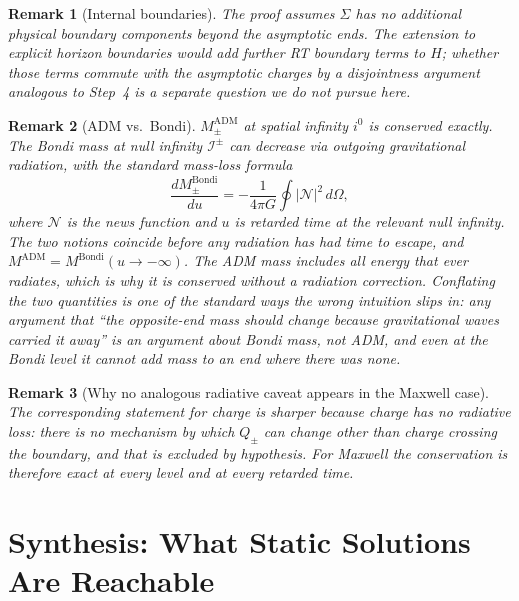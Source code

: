 \documentclass[aps,prd,onecolumn,nofootinbib,superscriptaddress]{revtex4-2}
\newtheorem{remark}{Remark}
\begin{document}
\begin{remark}[Internal boundaries]
The proof assumes $\Sigma$ has no additional physical boundary components beyond the asymptotic ends. The extension to explicit horizon boundaries would add further RT boundary terms to $H$; whether those terms commute with the asymptotic charges by a disjointness argument analogous to Step~4 is a separate question we do not pursue here.
\end{remark}

\begin{remark}[ADM vs.\ Bondi]
\label{rem:adm-vs-bondi}
$M_\pm^{\mathrm{ADM}}$ at spatial infinity $i^0$ is conserved exactly. The Bondi mass at null infinity $\mathcal{I}^\pm$ can decrease via outgoing gravitational radiation, with the standard mass-loss formula
\begin{equation}
\frac{dM_\pm^{\mathrm{Bondi}}}{du} = -\frac{1}{4\pi G}\oint |\mathcal{N}|^2\, d\Omega,
\end{equation}
where $\mathcal{N}$ is the news function and $u$ is retarded time at the relevant null infinity.\cite{BondiVanderBurgMetzner1962Gravitational,Sachs1962Asymptotic} The two notions coincide before any radiation has had time to escape, and $M^{\mathrm{ADM}} = M^{\mathrm{Bondi}}(u\to-\infty)$. The ADM mass includes all energy that ever radiates, which is why it is conserved without a radiation correction. Conflating the two quantities is one of the standard ways the wrong intuition slips in: any argument that ``the opposite-end mass should change because gravitational waves carried it away'' is an argument about Bondi mass, not ADM, and even at the Bondi level it cannot \emph{add} mass to an end where there was none.
\end{remark}

\begin{remark}[Why no analogous radiative caveat appears in the Maxwell case]
The corresponding statement for charge is sharper because charge has no radiative loss: there is no mechanism by which $Q_\pm$ can change other than charge crossing the boundary, and that is excluded by hypothesis. For Maxwell the conservation is therefore exact at every level and at every retarded time.
\end{remark}

\section{Synthesis: What Static Solutions Are Reachable}
\label{sec:synthesis}
\end{document}
